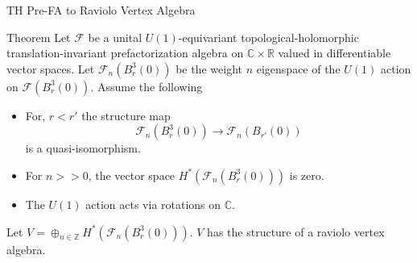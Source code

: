 \documentclass{beamer}
\newcommand{\C}{\mathbb{C}}
\newcommand{\Z}{\mathbb{Z}}
\newcommand{\R}{\mathbb{R}}
\begin{document}
\begin{frame}{TH Pre-FA to Raviolo Vertex Algebra}
    \begin{block}{Theorem}
        Let $\mathcal{F}$ be a unital $U(1)$-equivariant topological-holomorphic translation-invariant prefactorization algebra on
        $\C\times \R$ valued in differentiable vector spaces. Let $\mathcal{F}_n(B^3_r(0))$ be the weight $n$ eigenspace of the $U(1)$
        action on $\mathcal{F}(B^3_r(0))$. Assume the following
        \begin{itemize}
            \item For, $r<r'$ the structure  map
                  \[
                      \mathcal{F}_n(B^3_r(0)) \to \mathcal{F}_n(B_{r'}(0))
                  \]
                  is a quasi-isomorphism.
            \item For $n>>0$, the vector space $H^*(\mathcal{F}_n(B^3_r(0)))$ is zero.
            \item The $U(1)$ action acts via rotations on $\C$.
        \end{itemize}
        Let $V=\oplus_{n\in \Z} H^*(\mathcal{F}_n(B^3_r(0)))$. $V$ has the structure of a raviolo vertex algebra.
    \end{block}
\end{frame}



    
\end{document}
